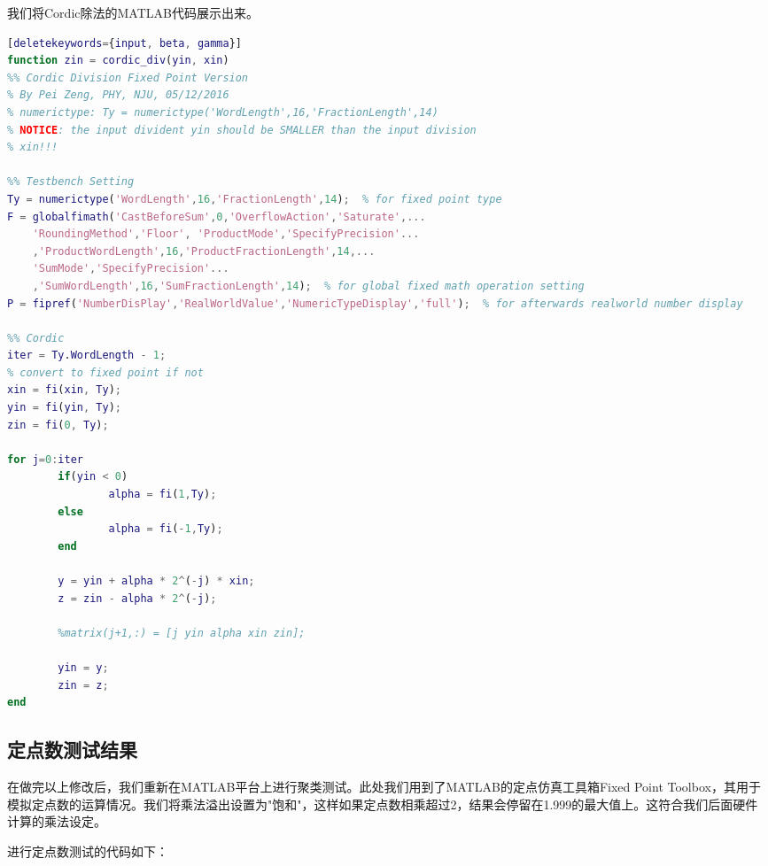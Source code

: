 我们将Cordic除法的MATLAB代码展示出来。
\begin{spacing}{1}
\begin{lstlisting}[language=Matlab][deletekeywords={input, beta, gamma}]
function zin = cordic_div(yin, xin)
%% Cordic Division Fixed Point Version
% By Pei Zeng, PHY, NJU, 05/12/2016
% numerictype: Ty = numerictype('WordLength',16,'FractionLength',14)
% NOTICE: the input divident yin should be SMALLER than the input division
% xin!!!

%% Testbench Setting
Ty = numerictype('WordLength',16,'FractionLength',14);  % for fixed point type
F = globalfimath('CastBeforeSum',0,'OverflowAction','Saturate',...
    'RoundingMethod','Floor', 'ProductMode','SpecifyPrecision'...    
    ,'ProductWordLength',16,'ProductFractionLength',14,... 
    'SumMode','SpecifyPrecision'...    
    ,'SumWordLength',16,'SumFractionLength',14);  % for global fixed math operation setting
P = fipref('NumberDisPlay','RealWorldValue','NumericTypeDisplay','full');  % for afterwards realworld number display

%% Cordic
iter = Ty.WordLength - 1;
% convert to fixed point if not
xin = fi(xin, Ty);
yin = fi(yin, Ty);
zin = fi(0, Ty);

for j=0:iter
        if(yin < 0)
                alpha = fi(1,Ty);
        else
                alpha = fi(-1,Ty);
        end
         
        y = yin + alpha * 2^(-j) * xin;
        z = zin - alpha * 2^(-j);
         
        %matrix(j+1,:) = [j yin alpha xin zin];
        
        yin = y;
        zin = z;
end
\end{lstlisting}
\end{spacing}


\subsection{定点数测试结果}
在做完以上修改后，我们重新在MATLAB平台上进行聚类测试。此处我们用到了MATLAB的定点仿真工具箱Fixed Point Toolbox，其用于模拟定点数的运算情况。我们将乘法溢出设置为"饱和"，这样如果定点数相乘超过2，结果会停留在1.999的最大值上。这符合我们后面硬件计算的乘法设定。

进行定点数测试的代码如下：


